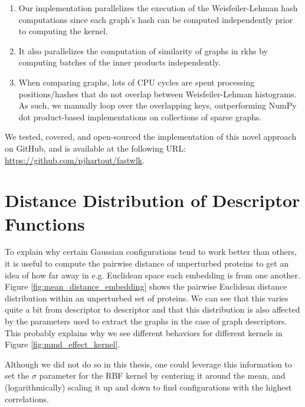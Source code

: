 \begin{enumerate}
\item Our implementation parallelizes the execution of the Weisfeiler-Lehman hash
computations since each graph's hash can be computed independently prior to
computing the kernel.
\item It also parallelizes the computation of similarity of graphs in \acrshort{rkhs} by
computing batches of the inner products independently.
\item When comparing graphs, lots of CPU cycles are spent processing
positions/hashes that do not overlap between Weisfeiler-Lehman
histograms. As such, we manually loop over the overlapping keys, outperforming
NumPy dot product-based implementations on collections of sparse graphs.
\end{enumerate}

We tested, covered, and open-sourced the implementation of this novel approach
on GitHub, and is available at the following URL: \url{https://github.com/pjhartout/fastwlk}.

\section{Distance Distribution of Descriptor Functions}\label{sec:distance_dist}
To explain why certain Gaussian configurations tend to work better than others,
it is useful to compute the pairwise distance of unperturbed proteins to get an
idea of how far away in e.g. Euclidean space each embedding is from one
another. Figure \ref{fig:mean_distance_embedding} shows the pairwise Euclidean
distance distribution within an unperturbed set of proteins. We can see that
this varies quite a bit from descriptor to descriptor and that this
distribution is also affected by the parameters used to extract the graphs in
the case of graph descriptors. This probably explains why we see different
behaviors for different kernels in Figure \ref{fig:mmd_effect_kernel}.

Although we did not do so in this thesis, one could leverage this information to
set the $\sigma$ parameter for the RBF kernel by centering it around the mean,
and (logarithmically) scaling it up and down to find configurations with the
highest correlations.

